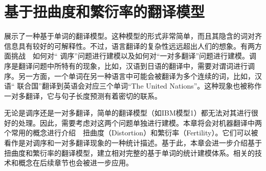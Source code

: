 
%


\renewcommand\figurename{图}%
\renewcommand\tablename{表}%


\chapter{基于扭曲度和繁衍率的翻译模型}

{\chapterfive}展示了一种基于单词的翻译模型。这种模型的形式非常简单，而且其隐含的词对齐信息具有较好的可解释性。不过，语言翻译的复杂性远远超出人们的想象。有两方面挑战\ \dash\ 如何对“ 调序”问题进行建模以及如何对“一对多翻译”问题进行建模。调序是翻译问题中所特有的现象，比如，汉语到日语的翻译中，需要对谓词进行调序。另一方面，一个单词在另一种语言中可能会被翻译为多个连续的词，比如，汉语“ 联合国”翻译到英语会对应三个单词“The United Nations”。这种现象也被称作一对多翻译，它与句子长度预测有着密切的联系。

无论是调序还是一对多翻译，简单的翻译模型（如IBM模型1）都无法对其进行很好的处理。因此，需要考虑对这两个问题单独进行建模。本章将会对机器翻译中两个常用的概念进行介绍\ \dash\ 扭曲度（Distortion）和繁衍率（Fertility）。它们可以被看作是对调序和一对多翻译现象的一种统计描述。基于此，本章会进一步介绍基于扭曲度和繁衍率的翻译模型，建立相对完整的基于单词的统计建模体系。相关的技术和概念在后续章节也会被进一步应用。


